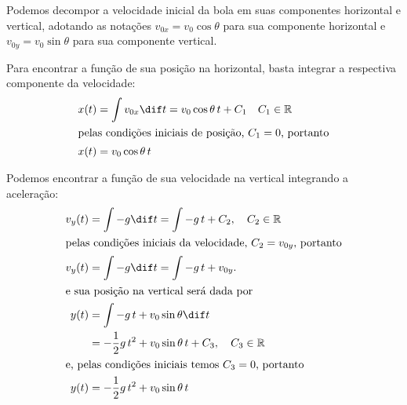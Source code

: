 \documentclass[]{IMTexam}
\begin{document}
\begin{questions}
\begin{solution}
		Podemos decompor a velocidade inicial da bola em suas componentes horizontal e vertical, adotando as notações $ v_{0x}=v_0\cos\theta $ para sua componente horizontal e $ v_{0y}=v_0\sin\theta $ para sua componente vertical.

		Para encontrar a função de sua posição na horizontal, basta integrar a respectiva componente da velocidade:
		\begin{align}
			x(t) & =\int v_{0x}\dif t=v_0\cos\theta\,t+C_1\quad C_1\in\mathbb{R} \\
			\intertext{pelas condições iniciais de posição, $ C_1=0 $, portanto}
			x(t) & =v_0\cos\theta\,t\label{eq:xtbb}
		\end{align}

		Podemos encontrar a função de sua velocidade na vertical integrando a aceleração:
		\begin{align}
			v_y(t) & =\int -g\dif t=\int -g\,t + C_2,\quad C_2\in \mathbb{R}\nonumber   \\
			\intertext{pelas condições iniciais da velocidade, $ C_2= v_{0y}$, portanto}
			v_y(t) & =\int -g\dif t=\int -g\,t + v_{0y}.\label{eq:vtbb}                 \\
			\intertext{e sua posição na vertical será dada por}
			y(t)   & =\int -g\,t+v_0\sin\theta \dif t                                   \\
			       & =-\dfrac{1}{2}g\,t^{2}+v_0\sin\theta\,t+C_3,\quad C_3\in\mathbb{R} \\
			\intertext{e, pelas condições iniciais temos $ C_3=0 $, portanto}
			y(t)   & =-\dfrac{1}{2}g\,t^{2}+v_0\sin\theta\,t\label{eq:ytbb}
		\end{align}


\end{solution}
\end{questions}
\end{document}
